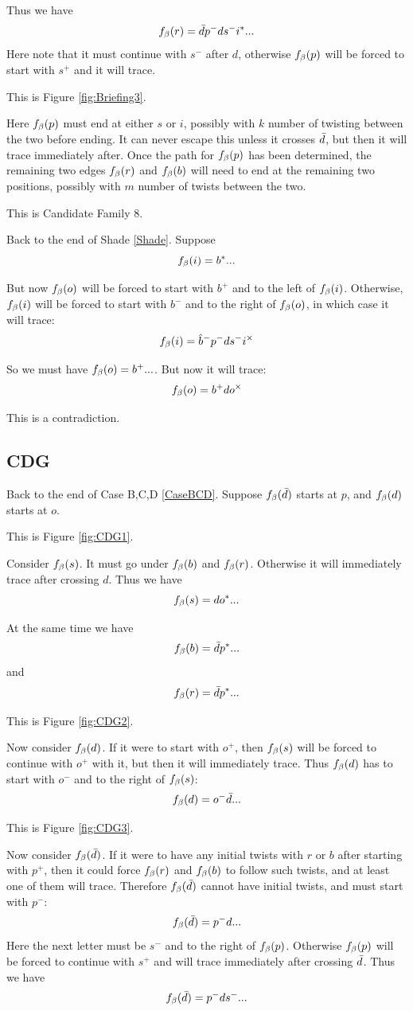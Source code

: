 Thus we have
\[
f_\beta(r) = \bar{d} p^- d s^- i^*...
\]
Here note that it must continue with $s^-$ after $d$, otherwise $f_\beta(p)$ will be forced to start with $s^+$ and it will trace. 

This is Figure \ref{fig:Briefing3}.

Here $f_\beta(p)$ must end at either $s$ or $i$, possibly with $k$ number of twisting between the two before ending. It can never escape this unless it crosses $\bar{d}$, but then it will trace immediately after. Once the path for $f_\beta(p)$ has been determined, the remaining two edges $f_\beta(r)$ and $f_\beta(b)$ will need to end at the remaining two positions, possibly with $m$ number of twists between the two.

This is Candidate Family 8.


Back to the end of Shade \ref{Shade}. Suppose
\[
f_\beta(i) = b^*...
\]

But now $f_\beta(o)$ will be forced to start with $b^+$ and to the left of $f_\beta(i)$. Otherwise, $f_\beta(i)$ will be forced to start with $b^-$ and to the right of $f_\beta(o)$, in which case it will trace:
\[
f_\beta(i) = \hat{b}^- p^- d s^- i^\times
\]

So we must have $f_\beta(o) = b^+...$. But now it will trace:
\[
f_\beta(o) = b^+ d o^\times
\]

This is a contradiction.

\subsection{CDG}\label{CDG}
Back to the end of Case B,C,D \ref{CaseBCD}. Suppose $f_\beta(\bar{d})$ starts at $p$, and $f_\beta(d)$ starts at $o$.

This is Figure \ref{fig:CDG1}.

Consider $f_\beta(s)$. It must go under $f_\beta(b)$ and $f_\beta(r)$. Otherwise it will immediately trace after crossing $d$. Thus we have
\[
f_\beta(s) = d o^*...
\]

At the same time we have
\[
f_\beta(b) = \bar{d} p^*...
\]
and
\[
f_\beta(r) = \bar{d} p^*...
\]

This is Figure \ref{fig:CDG2}.

Now consider $f_\beta(d)$. If it were to start with $o^+$, then $f_\beta(s)$ will be forced to continue with $o^+$ with it, but then it will immediately trace. Thus $f_\beta(d)$ has to start with $o^-$ and to the right of $f_\beta(s)$:
\[
f_\beta(d) = o^- \bar{d}...
\]

This is Figure \ref{fig:CDG3}.

Now consider $f_\beta(\bar{d})$. If it were to have any initial twists with $r$ or $b$ after starting with $p^+$, then it could force $f_\beta(r)$ and $f_\beta(b)$ to follow such twists, and at least one of them will trace. Therefore $f_\beta(\bar{d})$ cannot have initial twists, and must start with $p^-$:
\[
f_\beta(\bar{d}) = p^- d...
\]
Here the next letter must be $s^-$ and to the right of $f_\beta(p)$. Otherwise $f_\beta(p)$ will be forced to continue with $s^+$ and will trace immediately after crossing $\bar{d}$. Thus we have
\[
f_\beta(\bar{d}) = p^- d s^-...
\]

